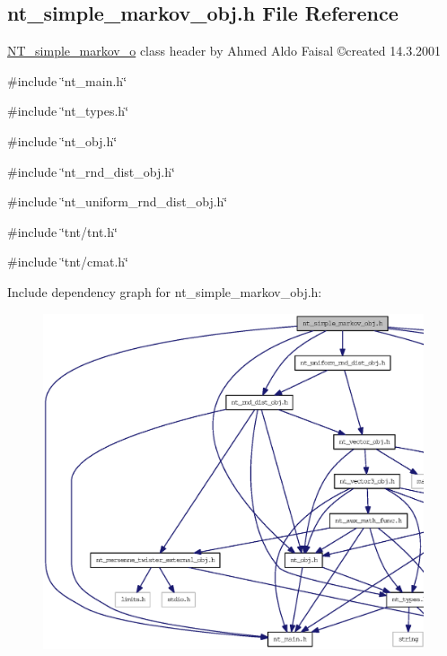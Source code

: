 \subsection{nt\_\-simple\_\-markov\_\-obj.h File Reference}
\label{nt__simple__markov__obj_8h}



\begin{DoxyItemize}
\item \hyperlink{class_n_t__simple__markov__o}{NT\_\-simple\_\-markov\_\-o} class header by Ahmed Aldo Faisal \copyright created 14.3.2001 
\end{DoxyItemize} 


{\ttfamily \#include \char`\"{}nt\_\-main.h\char`\"{}}\par
{\ttfamily \#include \char`\"{}nt\_\-types.h\char`\"{}}\par
{\ttfamily \#include \char`\"{}nt\_\-obj.h\char`\"{}}\par
{\ttfamily \#include \char`\"{}nt\_\-rnd\_\-dist\_\-obj.h\char`\"{}}\par
{\ttfamily \#include \char`\"{}nt\_\-uniform\_\-rnd\_\-dist\_\-obj.h\char`\"{}}\par
{\ttfamily \#include \char`\"{}tnt/tnt.h\char`\"{}}\par
{\ttfamily \#include \char`\"{}tnt/cmat.h\char`\"{}}\par
Include dependency graph for nt\_\-simple\_\-markov\_\-obj.h:
\nopagebreak
\begin{figure}[H]
\begin{center}
\leavevmode
\includegraphics[width=400pt]{nt__simple__markov__obj_8h__incl}
\end{center}
\end{figure}
